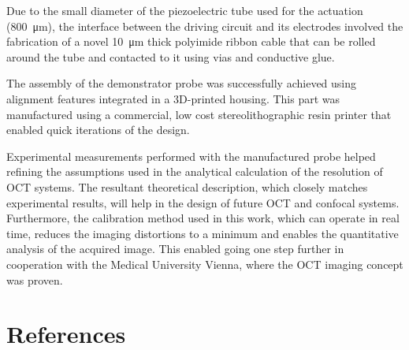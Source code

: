 \documentclass[10pt]{iopart}
\begin{document}
Due to the small diameter of the piezoelectric tube used for the actuation (\SI{800}{\micro\meter}), the interface between the driving circuit and its electrodes involved the fabrication of a novel \SI{10}{\micro\meter} thick polyimide ribbon cable that can be rolled around the tube and contacted to it using vias and conductive glue.

The assembly of the demonstrator probe was successfully achieved using alignment features integrated in a 3D-printed housing. This part was manufactured using a commercial, low cost stereolithographic resin printer that enabled quick iterations of the design. 

Experimental measurements performed with the manufactured probe helped refining the assumptions used in the analytical calculation of the resolution of OCT systems. The resultant theoretical description, which closely matches experimental results, will help in the design of future OCT and confocal systems. Furthermore, the calibration method used in this work, which can operate in real time, reduces the imaging distortions to a minimum and enables the quantitative analysis of the acquired image. This enabled going one step further in cooperation with the Medical University Vienna, where the OCT imaging concept was proven. 

\section*{References}






\end{document}
